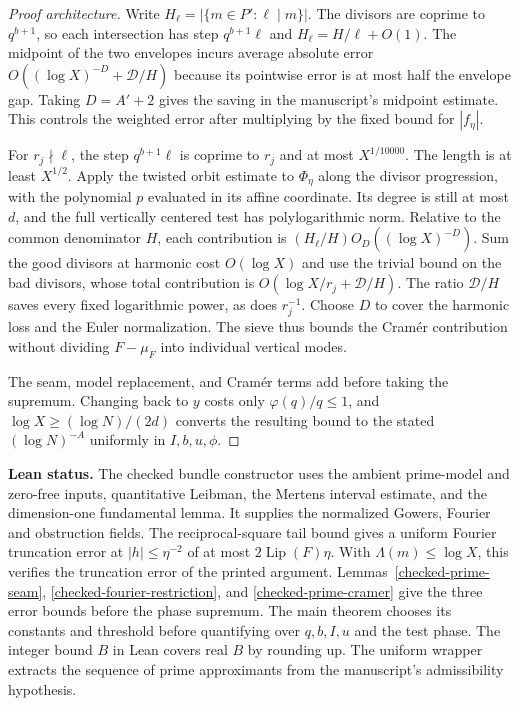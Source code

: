 \begin{proof}[Proof architecture]
Write $H_\ell=|\{m\in P':\ell\mid m\}|$. The divisors are
coprime to $q^{b+1}$, so each intersection has step
$q^{b+1}\ell$ and $H_\ell=H/\ell+O(1)$. The midpoint of
the two envelopes incurs average absolute error
$O((\log X)^{-D}+\mathcal D/H)$ because its pointwise
error is at most half the envelope gap. Taking $D=A'+2$ gives
the saving in the manuscript's midpoint estimate. This controls the
weighted error after multiplying by the fixed bound for $|f_\eta|$.

For $r_j\nmid\ell$, the step $q^{b+1}\ell$ is coprime to
$r_j$ and at most $X^{1/10000}$. The length is at least $X^{1/2}$.
Apply the twisted orbit estimate to $\Phi_\eta$ along the
divisor progression, with the polynomial $p$ evaluated in its
affine coordinate. Its degree is still at most $d$, and
the full vertically centered test has polylogarithmic norm.
Relative to the common denominator $H$, each contribution is
$(H_\ell/H)O_D((\log X)^{-D})$. Sum the good divisors at
harmonic cost $O(\log X)$ and use the trivial bound on the
bad divisors, whose total contribution is
$O(\log X/r_j+\mathcal D/H)$. The ratio $\mathcal D/H$
saves every fixed logarithmic power, as does $r_j^{-1}$.
Choose $D$ to cover the harmonic loss and the Euler
normalization. The sieve thus bounds the Cram\'er contribution
without dividing $F-\mu_F$ into individual vertical modes.

The seam, model replacement, and Cram\'er terms add before
taking the supremum. Changing back to $y$ costs only
$\varphi(q)/q\le1$, and $\log X\ge (\log N)/(2d)$
converts the resulting bound to the stated $(\log N)^{-A}$
uniformly in $I,b,u,\phi$.
\end{proof}
\noindent\textbf{Lean status.} The checked bundle constructor uses the
ambient prime-model and zero-free inputs, quantitative Leibman, the Mertens
interval estimate, and the dimension-one fundamental lemma.
It supplies the normalized Gowers, Fourier and obstruction fields.
The reciprocal-square tail bound gives a uniform Fourier truncation
error at $|h|\le\eta^{-2}$ of at most $2\operatorname{Lip}(F)\eta$.
With $\Lambda(m)\le\log X$, this verifies the truncation error of the
printed argument.
Lemmas~\ref{checked-prime-seam},
\ref{checked-fourier-restriction}, and \ref{checked-prime-cramer}
give the three error bounds before the phase supremum. The main
theorem chooses its constants and threshold before quantifying over
$q,b,I,u$ and the test phase. The integer bound $B$ in Lean covers
real $B$ by rounding up. The uniform wrapper extracts the sequence
of prime approximants from the manuscript's admissibility hypothesis.


